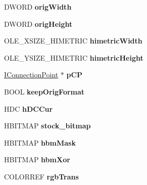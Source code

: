 \begin{DoxyCompactItemize}
D\+W\+O\+RD {\bfseries orig\+Width}
\item 
\mbox{\label{struct_o_l_e_picture_impl_a79ab6b0a9514e33dcf8eb8c0b3d7a523}} 
D\+W\+O\+RD {\bfseries orig\+Height}
\item 
\mbox{\label{struct_o_l_e_picture_impl_acdaabd472a622262a10dec5bb104c7dc}} 
O\+L\+E\+\_\+\+X\+S\+I\+Z\+E\+\_\+\+H\+I\+M\+E\+T\+R\+IC {\bfseries himetric\+Width}
\item 
\mbox{\label{struct_o_l_e_picture_impl_a7e28e395b80c09ea2d4feaf90bde4f71}} 
O\+L\+E\+\_\+\+Y\+S\+I\+Z\+E\+\_\+\+H\+I\+M\+E\+T\+R\+IC {\bfseries himetric\+Height}
\item 
\mbox{\label{struct_o_l_e_picture_impl_aae6d14ff0a68206dd540c0084f353891}} 
\hyperlink{interface_i_connection_point}{I\+Connection\+Point} $\ast$ {\bfseries p\+CP}
\item 
\mbox{\label{struct_o_l_e_picture_impl_a6d66c83931805b8d67846c20e4256dca}} 
B\+O\+OL {\bfseries keep\+Orig\+Format}
\item 
\mbox{\label{struct_o_l_e_picture_impl_adac81615681d9d20fe080fdae3082610}} 
H\+DC {\bfseries h\+D\+C\+Cur}
\item 
\mbox{\label{struct_o_l_e_picture_impl_ad77d5477aa18d721cf8a5fb9971c6ba3}} 
H\+B\+I\+T\+M\+AP {\bfseries stock\+\_\+bitmap}
\item 
\mbox{\label{struct_o_l_e_picture_impl_a334ffa9c6d902a95c84c419d9b97b05a}} 
H\+B\+I\+T\+M\+AP {\bfseries hbm\+Mask}
\item 
\mbox{\label{struct_o_l_e_picture_impl_ad5170eee3635d92b6ce84142196ca60e}} 
H\+B\+I\+T\+M\+AP {\bfseries hbm\+Xor}
\item 
\mbox{\label{struct_o_l_e_picture_impl_afbec297344addbf86ab9d846704aacd1}} 
C\+O\+L\+O\+R\+R\+EF {\bfseries rgb\+Trans}
\item 
\mbox{\label{struct_o_l_e_picture_impl_afb38b1fef0ef0d91794df5698e7202b8}} 

\end{DoxyCompactItemize}
